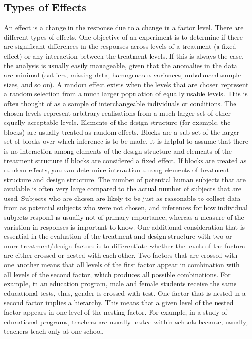 \begin{itemize}
\section{Types of Effects }
An effect is a change in the response due to a change in a factor level.  There are different types of effects.  One objective of an experiment is to determine if there are significant differences in the responses across levels of a treatment (a fixed effect) or any interaction  between the treatment levels.  If this is always the case, the analysis is usually easily  manageable, given that the anomalies in the data are minimal (outliers, missing data,  homogeneous variances, unbalanced sample sizes, and so on). 
A random effect exists when the levels that are chosen represent a random selection from a much larger population of equally usable levels. This is often thought of as a sample of interchangeable individuals or conditions.  The chosen levels represent arbitrary realisations from a much larger set of other equally acceptable levels.  Elements of the design structure (for example, the blocks) are usually treated as random  effects.  Blocks are a sub-set of the larger set of blocks over which inference is to be made.  It  is helpful to assume that there is no interaction among elements of the design structure and  elements of the treatment structure if blocks are considered a fixed effect.  If blocks are treated as random effects, you can determine interaction among elements of treatment structure and  design structure. 
The number of potential human subjects that are available is often very large compared to the actual number of subjects that are used.  Subjects who are chosen are likely to be just as reasonable to collect data from as potential subjects who were not chosen, and inferences for how individual subjects respond is usually not of primary importance, whereas a measure of the variation in responses is important to know. 
\newpage
One additional consideration that is essential in the evaluation of the treatment and design structure with two or more treatment/design factors is to differentiate whether the levels of the factors are either crossed or nested with each other. Two factors that are crossed with one another means that all levels of the first factor appear in combination with all levels of the second factor, which produces all possible combinations.  For example, in an education program, male and female students receive the same educational tests, thus, gender is crossed with test. 
One factor that is nested in a second factor implies a hierarchy.  This means that a given level of the nested factor appears in one level of the nesting factor.  For example, in a study of educational programs, teachers are usually nested within schools because, usually, teachers teach only at one school.

\end{itemize}
